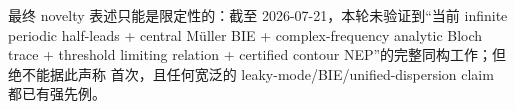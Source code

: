 \documentclass[UTF8,11pt,fontset=none]{ctexart}
\begin{document}
最终 novelty 表述只能是限定性的：截至 2026-07-21，本轮未验证到“当前 infinite
periodic half-leads + central Müller BIE + complex-frequency analytic Bloch trace +
threshold limiting relation + certified contour NEP”的完整同构工作；但绝不能据此声称
首次，且任何宽泛的 leaky-mode/BIE/unified-dispersion claim 都已有强先例。

\clearpage
\printbibliography[heading=bibintoc,title={参考文献}]
\end{document}
